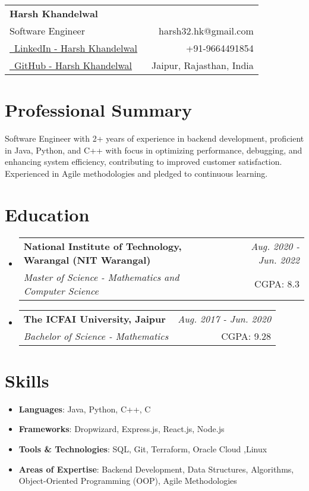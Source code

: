\documentclass[a4paper,12pt]{article}
\makeatletter
\newcommand{\resumeSubheading}[4]{
\vspace{-1.0mm}\item[]
    \begin{tabular*}{0.98\textwidth}[t]{l@{\extracolsep{\fill}}r}
        \textbf{#1} & \textit{\footnotesize{#4}} \\
        \textit{\footnotesize{#3}} &  \footnotesize{#2}\\
    \end{tabular*}
    \vspace{-1.0mm}
}
\newcommand{\resumeSubHeadingListStart}{\begin{itemize}[leftmargin=*,labelsep=0mm]}
\newcommand{\resumeHeadingSkillStart}{\begin{justify}\begin{itemize}[leftmargin=*,itemsep=0.5mm,noitemsep,labelsep=1.2mm, rightmargin=2ex]\small}
\newcommand{\resumeSubHeadingListEnd}{\end{itemize}\vspace{2mm}}
\newcommand{\resumeHeadingSkillEnd}{\end{itemize}\end{justify}\vspace{-2mm}}
\newcommand{\name}{Harsh Khandelwal} %
\newcommand{\phone}{9664491854} %
\newcommand{\emaila}{harsh32.hk@gmail.com} %
\makeatother
\begin{document}

\parbox{\dimexpr\linewidth-0.5cm\relax}{
\begin{tabularx}{\linewidth}{L r} \\
  \textbf{\Large \name}\\
  {Software Engineer} & \raisebox{0.0\height}{\footnotesize \faEnvelope}\ {\emaila} \\
  \href{https://www.linkedin.com/in/harsh-khandelwal-094866201/}{\raisebox{0.0\height}{\footnotesize \faLinkedin}\ LinkedIn - Harsh Khandelwal} &  {\raisebox{0.0\height}{\footnotesize \faPhone}\ +91-\phone} \\
  \href{https://github.com/redhlk}{\raisebox{0.0\height}{\footnotesize \faGithub}\ {GitHub - \name}}
  & {\raisebox{0.0\height}{\footnotesize}\ Jaipur, Rajasthan, India}\\
\end{tabularx}
}

\section{\textbf{Professional Summary}}
\begin{justify}
  Software Engineer with 2+ years of experience in backend development, proficient in Java, Python, and C++ with focus in optimizing performance, debugging, and enhancing system efficiency, contributing to improved customer satisfaction. Experienced in Agile methodologies and pledged to continuous learning.
\end{justify}
\section{\textbf{Education}}
  \resumeSubHeadingListStart
    \resumeSubheading
      {National Institute of Technology, Warangal (NIT Warangal)}{CGPA: 8.3}
      {Master of Science - Mathematics and Computer Science}{Aug. 2020 -  Jun. 2022}
    \resumeSubheading
      {The ICFAI University, Jaipur}{CGPA: 9.28}
      {Bachelor of Science - Mathematics}{Aug. 2017 - Jun. 2020}
  \resumeSubHeadingListEnd
\vspace{-13pt}

\section{\textbf{Skills}}
\resumeHeadingSkillStart
    \item \textbf{Languages}{: Java, Python, C++, C     }
    \item \textbf{Frameworks}{: Dropwizard, Express.js, React.js, Node.js          }
    \item \textbf{Tools \& Technologies}{: SQL, Git, Terraform, Oracle Cloud ,Linux         }
    \item \textbf{Areas of Expertise}{: Backend Development, Data Structures, Algorithms, Object-Oriented Programming (OOP), Agile Methodologies                   }
\resumeHeadingSkillEnd
\vspace{4pt}
\end{document}
